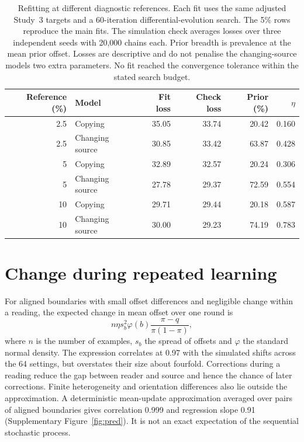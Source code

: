 \begin{table}[htbp]
\centering
\caption{Refitting at different diagnostic references. Each fit uses the same adjusted Study~3 targets and a 60-iteration differential-evolution search. The 5\% rows reproduce the main fits. The simulation check averages losses over three independent seeds with 20,000 chains each. Prior breadth is prevalence at the mean prior offset. Losses are descriptive and do not penalise the changing-source model\textquotesingle s two extra parameters. No fit reached the convergence tolerance within the stated search budget.}
\label{tab:reference}
\begingroup\small\setlength{\tabcolsep}{4pt}
\begin{tabular}{rlrrrr}
\toprule
Reference (\%) & Model & Fit loss & Check loss & Prior (\%) & $\eta$ \\
\midrule
2.5 & Copying & 35.05 & 33.74 & 20.42 & 0.160 \\
2.5 & Changing source & 30.85 & 33.42 & 63.87 & 0.428 \\
5 & Copying & 32.89 & 32.57 & 20.24 & 0.306 \\
5 & Changing source & 27.78 & 29.37 & 72.59 & 0.554 \\
10 & Copying & 29.71 & 29.44 & 20.18 & 0.587 \\
10 & Changing source & 30.00 & 29.23 & 74.19 & 0.783 \\
\bottomrule
\end{tabular}\endgroup
\end{table}

\FloatBarrier

\section{Change during repeated learning}
\label{sec:si_learning}

For aligned boundaries with small offset differences and negligible change within a reading, the expected change in mean offset over one round is
\[
n\eta s_b^2\varphi(b)\frac{\pi-q}{\pi(1-\pi)},
\]
where $n$ is the number of examples, $s_b$ the spread of offsets and $\varphi$ the standard normal density. The expression correlates at 0.97 with the simulated shifts across the 64 settings, but overstates their size about fourfold. Corrections during a reading reduce the gap between reader and source and hence the chance of later corrections. Finite heterogeneity and orientation differences also lie outside the approximation. A deterministic mean-update approximation averaged over pairs of aligned boundaries gives correlation 0.999 and regression slope 0.91 (Supplementary Figure~\ref{fig:pred}). It is not an exact expectation of the sequential stochastic process.


